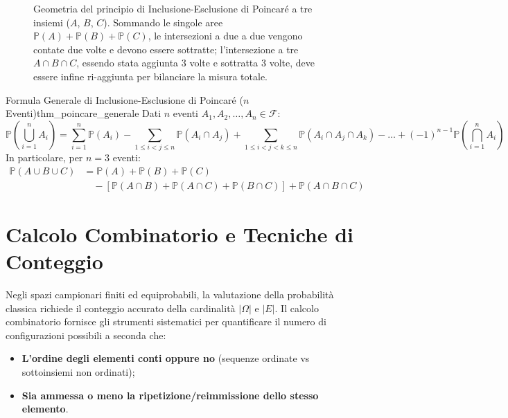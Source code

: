 \begin{figure}[htbp]
\centering

\caption{Geometria del principio di Inclusione-Esclusione di Poincaré a tre insiemi ($A$, $B$, $C$). Sommando le singole aree $\mathbb{P}(A)+\mathbb{P}(B)+\mathbb{P}(C)$, le intersezioni a due a due vengono contate due volte e devono essere sottratte; l'intersezione a tre $A \cap B \cap C$, essendo stata aggiunta 3 volte e sottratta 3 volte, deve essere infine ri-aggiunta per bilanciare la misura totale.}
\label{fig:inclusione_esclusione}
\end{figure}

\begin{teorema}{Formula Generale di Inclusione-Esclusione di Poincaré ($n$ Eventi)}{thm_poincare_generale}
Dati $n$ eventi $A_1, A_2, \dots, A_n \in \mathcal{F}$:
\begin{equation}
\mathbb{P}\left(\bigcup_{i=1}^n A_i\right) = \sum_{i=1}^n \mathbb{P}(A_i) - \sum_{1 \le i < j \le n} \mathbb{P}(A_i \cap A_j) + \sum_{1 \le i < j < k \le n} \mathbb{P}(A_i \cap A_j \cap A_k) - \dots + (-1)^{n-1} \mathbb{P}\left(\bigcap_{i=1}^n A_i\right)
\end{equation}
In particolare, per $n = 3$ eventi:
\begin{align}
\mathbb{P}(A \cup B \cup C) &= \mathbb{P}(A) + \mathbb{P}(B) + \mathbb{P}(C) \nonumber \\
&\quad - \left[\mathbb{P}(A \cap B) + \mathbb{P}(A \cap C) + \mathbb{P}(B \cap C)\right] + \mathbb{P}(A \cap B \cap C)
\end{align}
\end{teorema}

\section{Calcolo Combinatorio e Tecniche di Conteggio}
\label{sec:calcolo_combinatorio}

Negli spazi campionari finiti ed equiprobabili, la valutazione della probabilità classica richiede il conteggio accurato della cardinalità $|\Omega|$ e $|E|$. Il calcolo combinatorio fornisce gli strumenti sistematici per quantificare il numero di configurazioni possibili a seconda che:
\begin{itemize}
    \item \textbf{L'ordine degli elementi conti oppure no} (sequenze ordinate vs sottoinsiemi non ordinati);
    \item \textbf{Sia ammessa o meno la ripetizione/reimmissione dello stesso elemento}.
\end{itemize}

